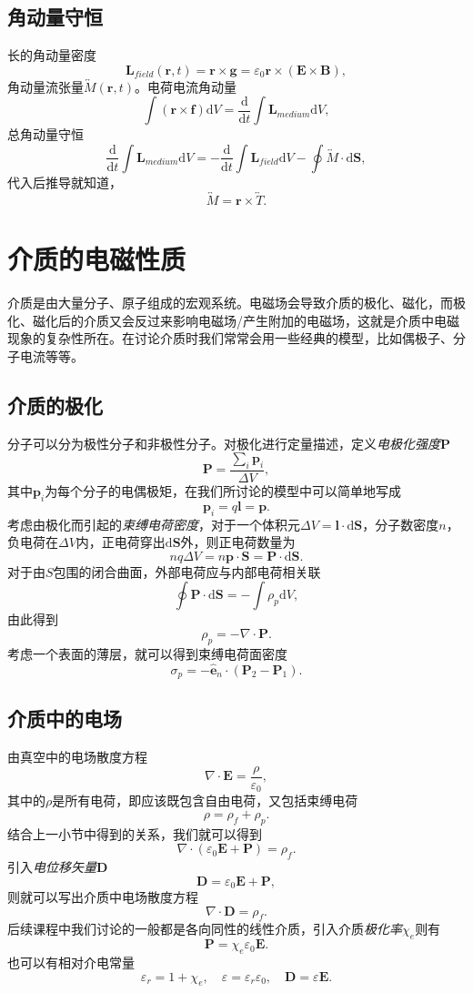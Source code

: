 \documentclass[UTF8]{ctexbook}
\renewcommand{\d}{\mathrm{d}}
\renewcommand{\b}{\boldsymbol}
\renewcommand{\t}{\overleftrightarrow}
\numberwithin{equation}{chapter}
\begin{document}
	\subsection{角动量守恒}
	长的角动量密度
	\[\b{L}_{field}(\b{r},t)=\b{r}\times\b{g}=\varepsilon_0\b{r}\times(\b{E}\times\b{B}),\]
	角动量流张量$\t{M}(\b{r},t)$。电荷电流角动量
	\[\int(\b{r}\times\b{f})\d V=\frac{\d }{\d t}\int \b{L}_{medium}\d V,\]
	总角动量守恒
	\[\frac{\d }{\d t}\int \b{L}_{medium}\d V=-\frac{\d }{\d t}\int \b{L}_{field}\d V-\oint \t{M}\cdot\d\b{S},\]
	代入后推导就知道，
	\[\t{M}=\b{r}\times\t{T}.\]
	
	
	
	
	
	\section{介质的电磁性质}
	介质是由大量分子、原子组成的宏观系统。电磁场会导致介质的极化、磁化，而极化、磁化后的介质又会反过来影响电磁场/产生附加的电磁场，这就是介质中电磁现象的复杂性所在。在讨论介质时我们常常会用一些经典的模型，比如偶极子、分子电流等等。
	
	\subsection{介质的极化}
	分子可以分为极性分子和非极性分子。对极化进行定量描述，定义\emph{电极化强度}$\b{P}$
	\[\b{P}=\frac{\sum_{i}\b{p}_i}{\Delta V},\]
	其中$\b{p}_i$为每个分子的电偶极矩，在我们所讨论的模型中可以简单地写成
	\[\b{p}_i=q\b{l}=\b{p}.\]
	考虑由极化而引起的\emph{束缚电荷密度}，对于一个体积元$\Delta V=\b{l}\cdot\d \b{S}$，分子数密度$n$，负电荷在$\Delta V$内，正电荷穿出$\d\b{S}$外，则正电荷数量为
	\[nq\Delta V=n\b{p}\cdot\b{S}=\b{P}\cdot\d\b{S}.\]
	对于由$S$包围的闭合曲面，外部电荷应与内部电荷相关联
	\[\oint \b{P}\cdot\d\b{S}=-\int \rho_p\d V,\]
	由此得到
	\[\rho_p=-\nabla\cdot\b{P}.\]
	考虑一个表面的薄层，就可以得到束缚电荷面密度
	\[\sigma_p=-\hat{\b{e}}_n\cdot(\b{P}_2-\b{P}_1).\]
	
	\subsection{介质中的电场}
	由真空中的电场散度方程
	\[\nabla \cdot\b{E}=\frac{\rho}{\varepsilon_0},\]
	其中的$\rho$是所有电荷，即应该既包含自由电荷，又包括束缚电荷
	\[\rho=\rho_{f}+\rho_p.\]
	结合上一小节中得到的关系，我们就可以得到
	\[\nabla\cdot(\varepsilon_0\b{E}+\b{P})=\rho_f.\]
	引入\emph{电位移矢量}$\b{D}$
	\[\b{D}=\varepsilon_0\b{E}+\b{P},\]
	则就可以写出介质中电场散度方程
	\[\nabla\cdot\b{D}=\rho_f.\]
	后续课程中我们讨论的一般都是各向同性的线性介质，引入介质\emph{极化率}$\chi_e$则有
	\[\b{P}=\chi_e\varepsilon_0\b{E}.\]
	也可以有相对介电常量
	\[\varepsilon_r=1+\chi_e,\quad \varepsilon=\varepsilon_r\varepsilon_0,\quad \b{D}=\varepsilon\b{E}.\]
	
\end{document}
